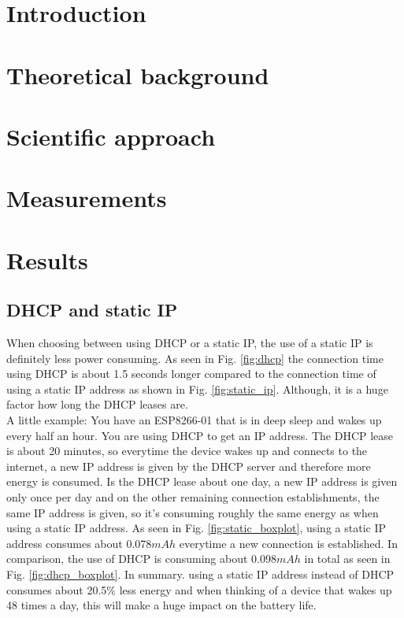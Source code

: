 \documentclass[conference]{IEEEtran}
\begin{document}
\section{Introduction}



\section{Theoretical background}







\section{Scientific approach}



\section{Measurements}









\section{Results}


\subsection{DHCP and static IP}
When choosing between using DHCP or a static IP, the use of a static IP is definitely less power consuming. 
As seen in Fig. \ref{fig:dhcp} the connection time using DHCP is about 1.5 seconds longer compared to the connection time of using a static IP address as shown in Fig. \ref{fig:static_ip}.
Although, it is a huge factor how long the DHCP leases are.\\
A little example: You have an ESP8266-01 that is in deep sleep and wakes up every half an hour. You are using DHCP to get an IP address. 
The DHCP lease is about 20 minutes, so everytime the device wakes up and connects to the internet, a new IP address is given by the DHCP server and therefore more energy is consumed.
Is the DHCP lease about one day, a new IP address is given only once per day and on the other remaining connection establishments, the same IP address is given, so it's consuming roughly the same energy as when using a static IP address.
As seen in Fig. \ref{fig:static_boxplot}, using a static IP address consumes about 0.078$mAh$ everytime a new connection is established.
In comparison, the use of DHCP is consuming about 0.098$mAh$ in total as seen in Fig. \ref{fig:dhcp_boxplot}.
In summary. using a static IP address instead of DHCP consumes about 20.5\% less energy and when thinking of a device that wakes up 48 times a day, this will make a huge impact on the battery life.
\end{document}
